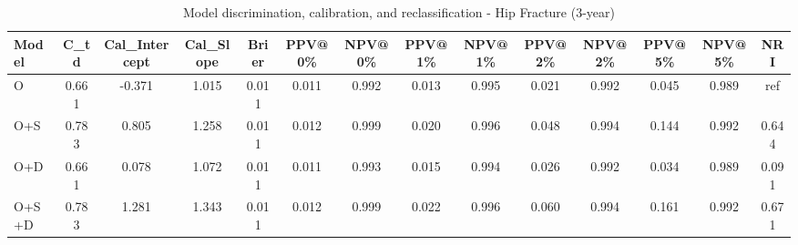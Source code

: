 \begin{table}[htbp]
\centering
\small
\caption{Model discrimination, calibration, and reclassification - Hip Fracture (3-year)}
\label{tab:perf_pd_3y}
\begin{tabular}{lccccccccccccc}
\toprule
Model & C\_td & Cal\_Intercept & Cal\_Slope & Brier & PPV@0\% & NPV@0\% & PPV@1\% & NPV@1\% & PPV@2\% & NPV@2\% & PPV@5\% & NPV@5\% & NRI \\
\midrule
O & 0.661 & -0.371 & 1.015 & 0.011 & 0.011 & 0.992 & 0.013 & 0.995 & 0.021 & 0.992 & 0.045 & 0.989 & ref \\
O+S & 0.783 & 0.805 & 1.258 & 0.011 & 0.012 & 0.999 & 0.020 & 0.996 & 0.048 & 0.994 & 0.144 & 0.992 & 0.644 \\
O+D & 0.661 & 0.078 & 1.072 & 0.011 & 0.011 & 0.993 & 0.015 & 0.994 & 0.026 & 0.992 & 0.034 & 0.989 & 0.091 \\
O+S+D & 0.783 & 1.281 & 1.343 & 0.011 & 0.012 & 0.999 & 0.022 & 0.996 & 0.060 & 0.994 & 0.161 & 0.992 & 0.671 \\
\bottomrule
\end{tabular}
\end{table}